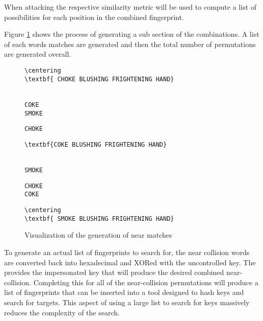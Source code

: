 When attacking the respective similarity metric will be used to compute a list of possibilities for each position in the combined fingerprint.

Figure \ref{fig:nearMatch} shows the process of generating a sub section of the combinations. A list of each words matches are generated and then the total number of permutations are generated overall.

\begin{figure}[h!]
    \centering
    \begin{BVerbatim}[commandchars=\\\{\}]
        \centering
\textbf{ CHOKE BLUSHING FRIGHTENING HAND}
    \end{BVerbatim}
    \\
    \verb|COKE                           |
    \\
    \verb|SMOKE                          |
    \\
    \hspace{1cm}



    \verb|CHOKE                          |
    \\
    \begin{BVerbatim}[commandchars=\\\{\}]
\textbf{COKE BLUSHING FRIGHTENING HAND}
    \end{BVerbatim}
    \\
    \verb|SMOKE                          |
    \\
    \hspace{1cm}


    \verb|CHOKE                          |
    \\
    \verb|COKE                           |
    \\
    \begin{BVerbatim}[commandchars=\\\{\}]
        \centering
\textbf{ SMOKE BLUSHING FRIGHTENING HAND}
    \end{BVerbatim}
    \caption{Visualization of the generation of near matches}
    \label{fig:nearMatch}
\end{figure}

To generate an actual list of fingerprints to search for, the near collision words are converted back into hexadecimal and XORed with the uncontrolled key. The provides the impersonated key that will produce the desired combined near-collision. Completing this for all of the near-collision permutations will produce a list of fingerprints that can be inserted into a tool designed to hash keys and search for targets. This aspect of using a large list to search for keys massively reduces the complexity of the search.

